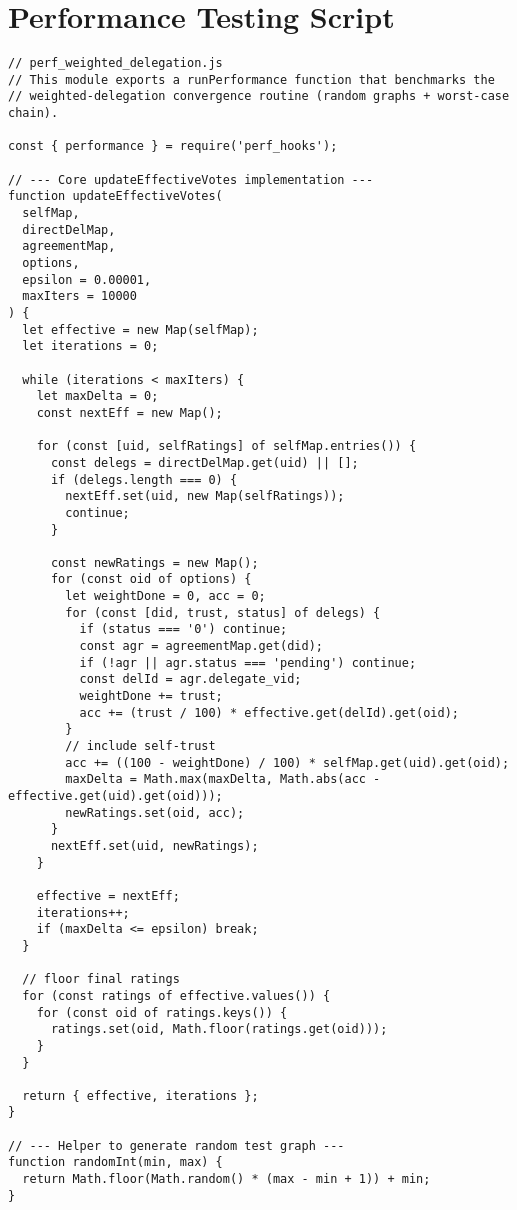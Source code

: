 \chapter{Performance Testing Script}\label{appendix:perf_weighted}
\begin{verbatim}
// perf_weighted_delegation.js
// This module exports a runPerformance function that benchmarks the
// weighted-delegation convergence routine (random graphs + worst-case chain).

const { performance } = require('perf_hooks');

// --- Core updateEffectiveVotes implementation ---
function updateEffectiveVotes(
  selfMap,
  directDelMap,
  agreementMap,
  options,
  epsilon = 0.00001,
  maxIters = 10000
) {
  let effective = new Map(selfMap);
  let iterations = 0;

  while (iterations < maxIters) {
    let maxDelta = 0;
    const nextEff = new Map();

    for (const [uid, selfRatings] of selfMap.entries()) {
      const delegs = directDelMap.get(uid) || [];
      if (delegs.length === 0) {
        nextEff.set(uid, new Map(selfRatings));
        continue;
      }

      const newRatings = new Map();
      for (const oid of options) {
        let weightDone = 0, acc = 0;
        for (const [did, trust, status] of delegs) {
          if (status === '0') continue;
          const agr = agreementMap.get(did);
          if (!agr || agr.status === 'pending') continue;
          const delId = agr.delegate_vid;
          weightDone += trust;
          acc += (trust / 100) * effective.get(delId).get(oid);
        }
        // include self-trust
        acc += ((100 - weightDone) / 100) * selfMap.get(uid).get(oid);
        maxDelta = Math.max(maxDelta, Math.abs(acc - effective.get(uid).get(oid)));
        newRatings.set(oid, acc);
      }
      nextEff.set(uid, newRatings);
    }

    effective = nextEff;
    iterations++;
    if (maxDelta <= epsilon) break;
  }

  // floor final ratings
  for (const ratings of effective.values()) {
    for (const oid of ratings.keys()) {
      ratings.set(oid, Math.floor(ratings.get(oid)));
    }
  }

  return { effective, iterations };
}

// --- Helper to generate random test graph ---
function randomInt(min, max) {
  return Math.floor(Math.random() * (max - min + 1)) + min;
}


\end{verbatim}
